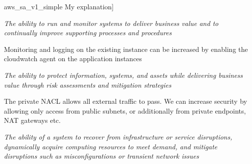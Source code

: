 
\imagefigsingle
{aws_sa_v1_simple}
{My explanation]}

\FloatBarrier
{}

\FloatBarrier


\textit{The ability to run and monitor systems to deliver business value and to continually improve supporting processes and procedures}


Monitoring and logging on the existing instance can be increased by enabling the cloudwatch agent on the application instances



\textit{The ability to protect information, systems, and assets while delivering business value through risk assessments and mitigation strategies}





The private NACL allows all external traffic to pass. We can increase security by allowing only access from public subnets, or additionally from private endpoints, NAT gateways etc.


\textit{The ability of a system to recover from infrastructure or service disruptions, dynamically acquire computing resources to meet demand, and mitigate disruptions such as misconfigurations or transient network issues}

